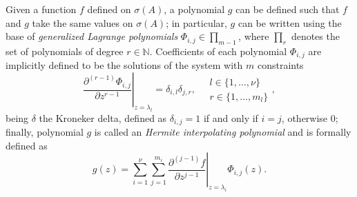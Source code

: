 Given a function $f$ defined on $\sigma(A)$, a polynomial $g$ can be defined
such that $f$ and $g$ take the same values on $\sigma(A)$; in particular, $g$
can be written using the base of \textit{generalized Lagrange polynomials}
$\Phi_{i,j}\in\prod_{m-1}$, where $\prod_{r}$ denotes the set of polynomials of
degree $r\in\mathbb{N}$. Coefficients of each polynomial $\Phi_{i,j}$ are implicitly
defined to be the solutions of the system with $m$ constraints
\begin{equation}
    \label{eq:Phi-polys-defining-constraints}
    \left. \frac{\partial^{(r-1)}{\Phi_{i,j}}}{\partial{z}^{r-1}} \right|_{z=\lambda_{l}} = \delta_{i,l}\delta_{j,r},
    \quad 
    \begin{array}{l} 
        l\in \lbrace 1, \ldots, \nu \rbrace \\
        r \in \lbrace 1, \ldots, m_{l} \rbrace
    \end{array},
\end{equation}
being $\delta$ the Kroneker delta, defined as $\delta_{i,j}=1$ if and only if
$i=j$, otherwise $0$; finally, polynomial $g$ is called an \emph{Hermite
interpolating polynomial} and is formally defined as
\begin{equation}
\label{eq:Hermite-interpolating-polynomial}
g(z) = \sum_{i=1}^{\nu}{\sum_{j=1}^{m_{i}}{ \left.
\frac{\partial^{(j-1)}{f}}{\partial{z}^{j-1}} \right|_{z=\lambda_{i}}\Phi_{i,j}(z) }}.
\end{equation}

